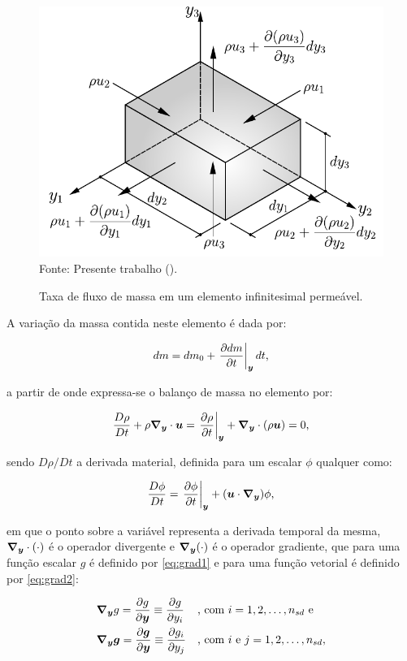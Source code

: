 \begin{figure}[h!]
    \centering
    \caption{Taxa de fluxo de massa em um elemento infinitesimal permeável.}
    \includegraphics[width=.5\linewidth]{Figuras/BalMas.pdf}
    \\Fonte: Presente trabalho (\the\year).
    \label{fig:BalMas}
\end{figure}

A variação da massa contida neste elemento é dada por:

\begin{equation}
    dm=dm_0+\left.\frac{\partial{dm}}{\partial{t}}\right|_{\boldsymbol{y}}dt\text{,}
\end{equation}

\noindent a partir de onde expressa-se o balanço de massa no elemento por:

\begin{equation}
    \frac{D\rho}{Dt}+\rho \boldsymbol{\nabla_y}\cdot\boldsymbol{u}=\left.\frac{\partial \rho}{\partial t}\right|_{\boldsymbol{y}}+\boldsymbol{\nabla_y}\cdot(\rho \boldsymbol{u})=0\text{,}
    \label{eq:BalMas}
\end{equation}

\noindent sendo $D\rho/Dt$ a derivada material, definida para um escalar $\phi$ qualquer como:

\begin{equation}
    \frac{D\phi}{Dt}=\left.\frac{\partial \phi}{\partial t}\right|_{\boldsymbol{y}}+(\boldsymbol{u}\cdot\boldsymbol{\nabla_y})\phi\text{,}
\end{equation}

\noindent em que o ponto sobre a variável representa a derivada temporal da mesma, $\boldsymbol{\nabla_y}\cdot(\cdot)$ é o operador divergente e $\boldsymbol{\nabla_y}(\cdot)$ é o operador gradiente, que para uma função escalar $g$ é definido por \eqref{eq:grad1} e para uma função vetorial é definido por \eqref{eq:grad2}:

\begin{subequations}
    \begin{align}
         & \boldsymbol{\nabla_y} g=\frac{\partial{g}}{\partial{\boldsymbol{y}}}\equiv\frac{\partial{g}}{\partial{y_i}}            &  & \text{, com }i=1,2,\hdots,n_{sd}\text{ e} \label{eq:grad1}    \\
         & \boldsymbol{\nabla_y}\boldsymbol{g}=\frac{\partial{\boldsymbol{g}}}{\partial{\boldsymbol{y}}}\equiv\frac{\partial{g_i}}{\partial{y_j}} &  & \text{, com }i\text{ e }j=1,2,\hdots,n_{sd}, \label{eq:grad2}
    \end{align}
\end{subequations}

